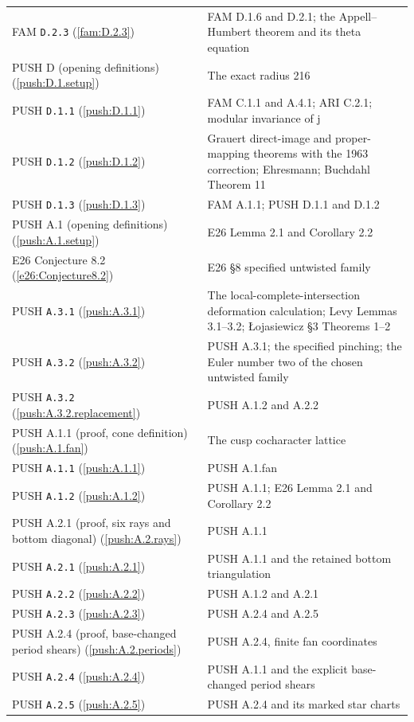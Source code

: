\documentclass[11pt,a4paper]{article}
\theoremstyle{plain}
\theoremstyle{definition}
\begin{document}
\begin{longtable}{@{}L{.21\linewidth}L{.73\linewidth}@{}}
FAM \nolinkurl{D.2.3} (\ref{fam:D.2.3}) & FAM D.1.6 and D.2.1; the Appell--Humbert theorem and its theta equation\\
PUSH D (opening definitions) (\ref{push:D.1.setup}) & The exact radius 216\\
PUSH \nolinkurl{D.1.1} (\ref{push:D.1.1}) & FAM C.1.1 and A.4.1; ARI C.2.1; modular invariance of j\\
PUSH \nolinkurl{D.1.2} (\ref{push:D.1.2}) & Grauert direct-image and proper-mapping theorems with the 1963 correction; Ehresmann; Buchdahl Theorem 11\\
PUSH \nolinkurl{D.1.3} (\ref{push:D.1.3}) & FAM A.1.1; PUSH D.1.1 and D.1.2\\
PUSH A.1 (opening definitions) (\ref{push:A.1.setup}) & E26 Lemma 2.1 and Corollary 2.2\\
E26 Conjecture 8.2 (\ref{e26:Conjecture8.2}) & E26 §8 specified untwisted family\\
PUSH \nolinkurl{A.3.1} (\ref{push:A.3.1}) & The local-complete-intersection deformation calculation; Levy Lemmas 3.1--3.2; \L{}ojasiewicz \S3 Theorems 1--2\\
PUSH \nolinkurl{A.3.2} (\ref{push:A.3.2}) & PUSH A.3.1; the specified pinching; the Euler number two of the chosen untwisted family\\
PUSH \nolinkurl{A.3.2} (\ref{push:A.3.2.replacement}) & PUSH A.1.2 and A.2.2\\
PUSH A.1.1 (proof, cone definition) (\ref{push:A.1.fan}) & The cusp cocharacter lattice\\
PUSH \nolinkurl{A.1.1} (\ref{push:A.1.1}) & PUSH A.1.fan\\
PUSH \nolinkurl{A.1.2} (\ref{push:A.1.2}) & PUSH A.1.1; E26 Lemma 2.1 and Corollary 2.2\\
PUSH A.2.1 (proof, six rays and bottom diagonal) (\ref{push:A.2.rays}) & PUSH A.1.1\\
PUSH \nolinkurl{A.2.1} (\ref{push:A.2.1}) & PUSH A.1.1 and the retained bottom triangulation\\
PUSH \nolinkurl{A.2.2} (\ref{push:A.2.2}) & PUSH A.1.2 and A.2.1\\
PUSH \nolinkurl{A.2.3} (\ref{push:A.2.3}) & PUSH A.2.4 and A.2.5\\
PUSH A.2.4 (proof, base-changed period shears) (\ref{push:A.2.periods}) & PUSH A.2.4, finite fan coordinates\\
PUSH \nolinkurl{A.2.4} (\ref{push:A.2.4}) & PUSH A.1.1 and the explicit base-changed period shears\\
PUSH \nolinkurl{A.2.5} (\ref{push:A.2.5}) & PUSH A.2.4 and its marked star charts\\

\end{longtable}
\end{document}
